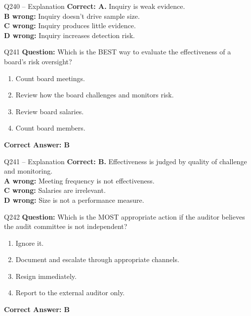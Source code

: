 \documentclass[aspectratio=169,10pt]{beamer}
\begin{document}
	\begin{frame}[t]{Q240 -- Explanation}
		\small
		\textbf{Correct: A.} Inquiry is weak evidence. \\[4pt]
		\textbf{B wrong:} Inquiry doesn't drive sample size. \\[2pt]
		\textbf{C wrong:} Inquiry produces little evidence. \\[2pt]
		\textbf{D wrong:} Inquiry increases detection risk.
	\end{frame}
	
	\begin{frame}[t]{Q241}
		\small
		\textbf{Question:} Which is the BEST way to evaluate the effectiveness of a board's risk oversight?
		\begin{enumerate}[label=\Alph*.,itemsep=1pt,topsep=2pt]
			\item Count board meetings.
			\item Review how the board challenges and monitors risk.
			\item Review board salaries.
			\item Count board members.
		\end{enumerate}
		\vspace{4pt}
		\textbf{Correct Answer: B}
	\end{frame}
	
	\begin{frame}[t]{Q241 -- Explanation}
		\small
		\textbf{Correct: B.} Effectiveness is judged by quality of challenge and monitoring. \\[4pt]
		\textbf{A wrong:} Meeting frequency is not effectiveness. \\[2pt]
		\textbf{C wrong:} Salaries are irrelevant. \\[2pt]
		\textbf{D wrong:} Size is not a performance measure.
	\end{frame}
	
	\begin{frame}[t]{Q242}
		\small
		\textbf{Question:} Which is the MOST appropriate action if the auditor believes the audit committee is not independent?
		\begin{enumerate}[label=\Alph*.,itemsep=1pt,topsep=2pt]
			\item Ignore it.
			\item Document and escalate through appropriate channels.
			\item Resign immediately.
			\item Report to the external auditor only.
		\end{enumerate}
		\vspace{4pt}
		\textbf{Correct Answer: B}
	\end{frame}
	
\end{document}
